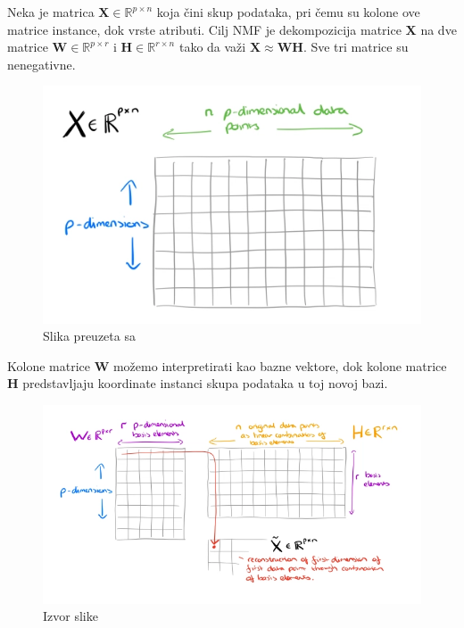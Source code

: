 \documentclass[a4paper]{article}
\begin{document}
Neka je matrica $\mathbf{X} \in \mathbb{R}^{p\times n}$ koja čini skup podataka, pri čemu su kolone ove matrice instance, dok vrste atributi. Cilj NMF je dekompozicija matrice $\mathbf{X}$ na dve matrice $\mathbf{W} \in  \mathbb{R}^{p\times r} $ i $\mathbf{H} \in  \mathbb{R}^{r\times n}$ tako da važi $\mathbf{X} \approx \mathbf{W}\mathbf{H}$. Sve tri matrice su nenegativne.

\begin{figure}[H]
\centering
\caption{Slika preuzeta sa \cite{lamacraftausten}}
\includegraphics[scale=0.6]{x_nmf}
\end{figure}

Kolone matrice $\mathbf{W}$ možemo interpretirati kao bazne vektore, dok kolone matrice $\mathbf{H}$ predstavljaju koordinate instanci skupa podataka u toj novoj bazi.

\begin{figure}[H]
\centering

\includegraphics[scale=0.6]{wh_nmf}
\caption{Izvor slike \cite{lamacraftausten}}
\end{figure}
\end{document}

